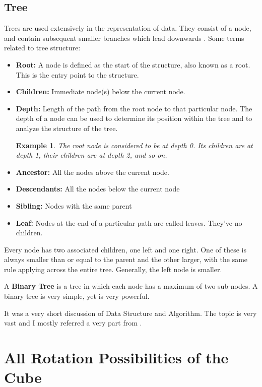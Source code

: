 \documentclass[12pt,a4paper]{article}
\theoremstyle{custom}
\newtheorem*{example}{Example}
\begin{document}
\subsection*{Tree}
 Trees are used extensively in the representation of data. They consist of a node, and contain subsequent smaller branches which lead downwards \cite{antunes_time_complexity}. 
\vspace{4mm}
\noindent Some terms related to tree structure:
\begin{itemize}
    \item \textbf{Root:} A node is defined as the start of the structure, also known as a root. This is the entry point to the structure.
    \item \textbf{Children:} Immediate node(s) below the current node.
    \item \textbf{Depth:} Length of the path from the root node to that particular node. The depth of a node can be used to determine its position within the tree and to analyze the structure of the tree.
\begin{example}
The root node is considered to be at depth 0. Its children are at depth 1, their children are at depth 2, and so on. 
\end{example}
    \item \textbf{Ancestor:} All the nodes above the current node.
    \item \textbf{Descendants:} All the nodes below the current node
    \item \textbf{Sibling:} Nodes with the same parent
    \item \textbf{Leaf:} Nodes at the end of a particular path are called leaves. They've no children.
\end{itemize}

 Every node has two associated children, one left and one right. One of these is always smaller than or equal to the parent and the other larger, with the same rule applying across the entire tree. Generally, the left node is smaller.


A \textbf{Binary Tree} is a tree in which each node has a maximum of two sub-nodes. A binary tree is very simple, yet is very powerful.


It was a very short discussion of Data Structure and Algorithm. The topic is very vast and I mostly referred a very part from \cite{bds,fox}.

\newpage
\section{All Rotation Possibilities of the Cube}
\label{Appendix_RotationsOfCube}
\end{document}
